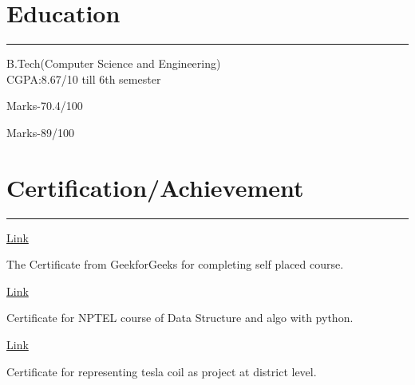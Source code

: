 \documentclass[]{vishal-kathpalia}
\begin{document}
\begin{minipage}[t]{0.66\textwidth}
\section{Education} 
\noindent\rule{12.5cm}{0.4pt}
 
\noindent
\hspace{5em}%
\begin{minipage}{0.85\textwidth\vspace{2pt}}
B.Tech(Computer Science and Engineering)\\
CGPA:8.67/10 till 6th semester
\end{minipage}
 
\noindent
\hspace{5em}%
\begin{minipage}{0.85\textwidth\vspace{2pt}}
Marks-70.4/100%
\end{minipage}
 
\noindent
\hspace{5em}%
\begin{minipage}{0.85\textwidth\vspace{2pt}}
Marks-89/100%
\end{minipage}
\section{Certification/Achievement}
\noindent\rule{12.5cm}{0.4pt}
\datecolor{} 
\href{https://media.geeksforgeeks.org/courses/certificates/7e0c1b60db575360591b18b9aa976a2f.pdf}{Link}
\noindent
\hspace{0em}%
\begin{minipage}{0.95\textwidth\vspace{2.5pt}}
The Certificate from GeekforGeeks for completing self placed course.
\end{minipage}
\datecolor{} 
\href{https://nptel.ac.in/noc/E_Certificate/NPTEL19CS40S11330023191131923}{Link}
\noindent
\hspace{0em}%
\begin{minipage}{0.95\textwidth\vspace{2.5pt}}
Certificate for NPTEL course of Data Structure and algo with python.
\end{minipage}
\datecolor{} 
\href{https://ibb.co/DYRmZzF}{Link}
\noindent
\hspace{0em}%
\begin{minipage}{0.95\textwidth\vspace{2.5pt}}
Certificate for representing tesla coil as project at district level.
\end{minipage}
\end{minipage} 
\end{document}
